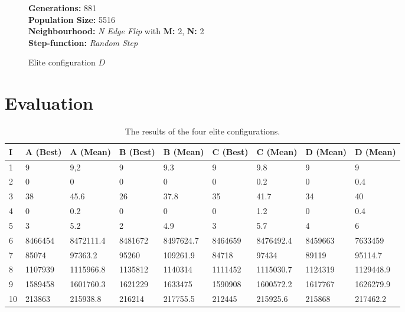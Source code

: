\documentclass [11pt]{article}
\begin{document}
\begin{figure}[H]
  \textbf{Generations:} 881 \\
\textbf{Population Size:} 5516 \\
\textbf{Neighbourhood:} \emph{N Edge Flip} with \textbf{M:} 2, \textbf{N:} 2\\
\textbf{Step-function:} \emph{Random Step} 
\caption{Elite configuration $D$}
\end{figure}

\section{Evaluation}

\begin{table}[]
\centering
\caption{The results of the four elite configurations.}
\label{my-label}
\begin{tabular}{|l|l|l|l|l|l|l|l|l|}
\hline
I & A (Best) & A (Mean)  & B (Best) & B (Mean)  & C (Best) & C (Mean)  & D (Mean) & D (Mean)  \\ \hline
1        & 9        & 9,2       & 9        & 9.3       & 9        & 9.8       & 9        & 9         \\ \hline
2        & 0        & 0         & 0        & 0         & 0        & 0.2       & 0        & 0.4       \\ \hline
3        & 38       & 45.6      & 26       & 37.8      & 35       & 41.7      & 34       & 40        \\ \hline
4        & 0        & 0.2       & 0        & 0         & 0        & 1.2       & 0        & 0.4       \\ \hline
5        & 3        & 5.2       & 2        & 4.9       & 3        & 5.7       & 4        & 6         \\ \hline
6        & 8466454  & 8472111.4 & 8481672  & 8497624.7 & 8464659  & 8476492.4 & 8459663  & 7633459   \\ \hline
7        & 85074    & 97363.2   & 95260    & 109261.9  & 84718    & 97434     & 89119    & 95114.7   \\ \hline
8        & 1107939  & 1115966.8 & 1135812  & 1140314   & 1111452  & 1115030.7 & 1124319  & 1129448.9 \\ \hline
9        & 1589458  & 1601760.3 & 1621229  & 1633475   & 1590908  & 1600572.2 & 1617767  & 1626279.9 \\ \hline
10       & 213863   & 215938.8  & 216214   & 217755.5  & 212445   & 215925.6  & 215868   & 217462.2  \\ \hline
\end{tabular}
\end{table}
\end{document}
